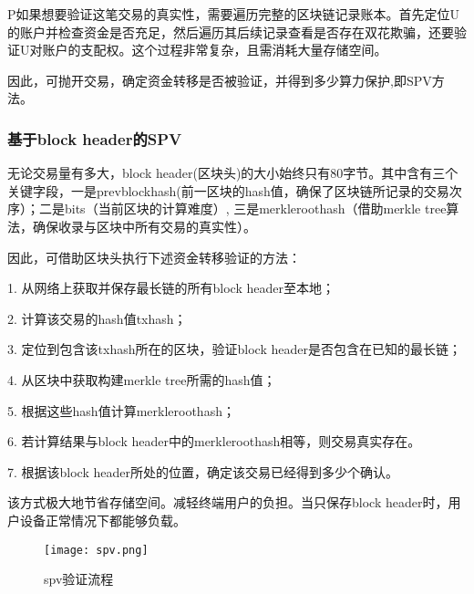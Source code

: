 \documentclass[withoutpreface,bwprint]{cumcmthesis} %
\begin{document}
P如果想要验证这笔交易的真实性，需要遍历完整的区块链记录账本。首先定位U的账户并检查资金是否充足，然后遍历其后续记录查看是否存在双花欺骗，还要验证U对账户的支配权。这个过程非常复杂，且需消耗大量存储空间。

因此，可抛开交易，确定资金转移是否被验证，并得到多少算力保护,即SPV方法。

\subsubsection{基于block header的SPV}
	
无论交易量有多大，block header(区块头)的大小始终只有80字节。其中含有三个关键字段，一是prev\underline{\hspace{0.5em}}block\underline{\hspace{0.5em}}hash(前一区块的hash值，确保了区块链所记录的交易次序）；二是bits（当前区块的计算难度）, 三是merkle\underline{\hspace{0.5em}}root\underline{\hspace{0.5em}}hash（借助merkle tree算法，确保收录与区块中所有交易的真实性）。

因此，可借助区块头执行下述资金转移验证的方法：

1. 从网络上获取并保存最长链的所有block header至本地；

2. 计算该交易的hash值tx\underline{\hspace{0.5em}}hash；

3. 定位到包含该tx\underline{\hspace{0.5em}}hash所在的区块，验证block header是否包含在已知的最长链；

4. 从区块中获取构建merkle tree所需的hash值；

5. 根据这些hash值计算merkle\underline{\hspace{0.5em}}root\underline{\hspace{0.5em}}hash；

6. 若计算结果与block header中的merkle\underline{\hspace{0.5em}}root\underline{\hspace{0.5em}}hash相等，则交易真实存在。

7. 根据该block header所处的位置，确定该交易已经得到多少个确认。

该方式极大地节省存储空间。减轻终端用户的负担。当只保存block header时，用户设备正常情况下都能够负载。

\begin{figure}[ht]
	\centering
	\texttt{[image: spv.png]}
	\caption{spv验证流程}
\end{figure}
\end{document}
